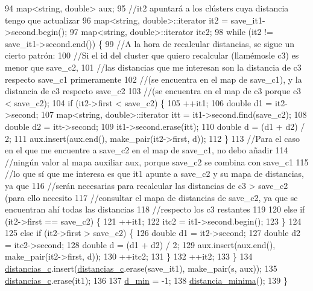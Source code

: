 \begin{DoxyCode}
94   map<string, double> aux;
95   \textcolor{comment}{//it2 apuntará a los clústers cuya distancia tengo que actualizar}
96   map<string, double>::iterator it2 = save\_it1->second.begin();
97   map<string, double>::iterator itc2;
98   \textcolor{keywordflow}{while} (it2 != save\_it1->second.end()) \{
99     \textcolor{comment}{//A la hora de recalcular distancias, se sigue un cierto patrón:}
100     \textcolor{comment}{//Si el id del cluster que quiero recalcular (llamémosle c3) es menor que save\_c2,}
101     \textcolor{comment}{//las distancias que me interesan son la distancia de c3 respecto save\_c1 primeramente}
102     \textcolor{comment}{//(se encuentra en el map de save\_c1), y la distancia de c3 respecto save\_c2}
103     \textcolor{comment}{//(se encuentra en el map de c3 porque c3 < save\_c2);}
104     \textcolor{keywordflow}{if} (it2->first < save\_c2) \{
105       ++it1;
106       \textcolor{keywordtype}{double} d1 = it2->second;
107       map<string, double>::iterator itt = it1->second.find(save\_c2);
108       \textcolor{keywordtype}{double} d2 = itt->second;
109       it1->second.erase(itt);
110       \textcolor{keywordtype}{double} d = (d1 + d2) / 2;
111       aux.insert(aux.end(), make\_pair(it2->first, d));
112     \}
113     \textcolor{comment}{//Para el caso en el que me encuentre a save\_c2 en el map de save\_c1, no debo añadir}
114     \textcolor{comment}{//ningún valor al mapa auxiliar aux, porque save\_c2 se combina con save\_c1}
115     \textcolor{comment}{//lo que sí que me interesa es que it1 apunte a save\_c2 y su mapa de distancias, ya que}
116     \textcolor{comment}{//serán necesarias para recalcular las distancias de c3 > save\_c2 (para ello necesito}
117     \textcolor{comment}{//consultar el mapa de distancias de save\_c2, ya que se encuentran ahí todas las distancias}
118     \textcolor{comment}{//respecto los c3 restantes}
119 
120     \textcolor{keywordflow}{else} \textcolor{keywordflow}{if} (it2->first == save\_c2) \{
121       ++it1;
122       itc2 = it1->second.begin();
123     \}
124 
125     \textcolor{keywordflow}{else} \textcolor{keywordflow}{if} (it2->first > save\_c2) \{
126       \textcolor{keywordtype}{double} d1 = it2->second;
127       \textcolor{keywordtype}{double} d2 = itc2->second;
128       \textcolor{keywordtype}{double} d = (d1 + d2) / 2;
129       aux.insert(aux.end(), make\_pair(it2->first, d));
130       ++itc2;
131     \}
132     ++it2;
133   \}
134   \hyperlink{class_cjt___clusters_a2b912c7987fd370bdeaf5dabb966240f}{distancias\_c}.insert(\hyperlink{class_cjt___clusters_a2b912c7987fd370bdeaf5dabb966240f}{distancias\_c}.erase(save\_it1), make\_pair(s, aux));
135   \hyperlink{class_cjt___clusters_a2b912c7987fd370bdeaf5dabb966240f}{distancias\_c}.erase(it1);
136 
137   \hyperlink{class_cjt___clusters_a1b94b5f25778ee95796a9be966f1c619}{d\_min} = -1;
138   \hyperlink{class_cjt___clusters_ac0e4dd151f0bbd2954d44551330a8757}{distancia\_minima}();
139 \}
\end{DoxyCode}


